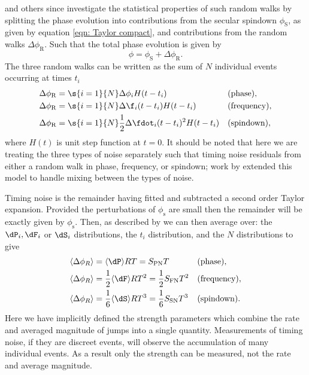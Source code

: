 \citet{Boynton1972} and others since investigate the statistical properties of
such random walks by splitting the phase evolution into contributions from the
secular spindown $\phi_{\mathrm{S}}$, as given by equation \eqref{eqn: Taylor
compact}, and contributions from the random walks $\Delta\phi_\mathrm{R}$. Such
that the total phase evolution is given by
\begin{equation}
    \phi = \phi_{\mathrm{S}} + \Delta\phi_{\mathrm{R}}.
\end{equation}
The three random walks can be written as the sum of $N$ individual events
occurring at times $t_{i}$
\begin{align}
    \Delta\phi_{\mathrm{R}} & = \s{i=1}{N}\Delta\phi_{i} H(t - t_{i})
     && \mathrm{(phase),} \\
    \Delta\phi_{\mathrm{R}} & = \s{i=1}{N}\Delta\f_{i} (t-t_{i})H(t - t_{i})
     && \mathrm{(frequency),} \\
    \Delta\phi_{\mathrm{R}} & = \s{i=1}{N}\frac{1}{2}\Delta\fdot_{i} (t-t_{i})^{2}H(t - t_{i})
     && \mathrm{(spindown),}
\end{align}
where $H(t)$ is unit step function at $t=0$. It should be noted that here we are
treating the three types of noise separately such that timing noise residuals
from either a random walk in phase, frequency, or spindown; work by \citet{Cordes1980}
extended this model to handle mixing between the types of noise.

Timing noise is the remainder having
fitted and subtracted a second order Taylor expansion. Provided the perturbations
of $\phi_{\mathrm{s}}$ are small then the remainder will be exactly given by
$\phi_{\mathrm{s}}$. Then, as described by \citet{Boynton1972} we can then
average over: the $\dP_{i}, \dF_{i}$ or $\dS_{i}$
distributions, the $t_{i}$ distribution, and the $N$ distributions to give
\begin{align}
    \langle \Delta\phi_{R} \rangle & = \langle \dP \rangle R T
    = S_{\mathrm{PN}}T && \mathrm{(phase),} \\
    \langle \Delta\phi_{R} \rangle & = \frac{1}{2}\langle \dF \rangle R T^{2}
    = \frac{1}{2}S_{\mathrm{FN}}T^{2} && \mathrm{(frequency),} \\
    \langle \Delta\phi_{R} \rangle & = \frac{1}{6}\langle \dS \rangle R T^{3}
    = \frac{1}{6}S_{\mathrm{SN}}T^{3} && \mathrm{(spindown).}
\end{align}
Here we have implicitly defined the strength parameters which combine the rate
and averaged magnitude of jumps into a single quantity. Measurements of timing
noise, if they are discreet events, will observe the accumulation of many
individual events. As a result only the strength can be
measured, not the rate and average magnitude.

